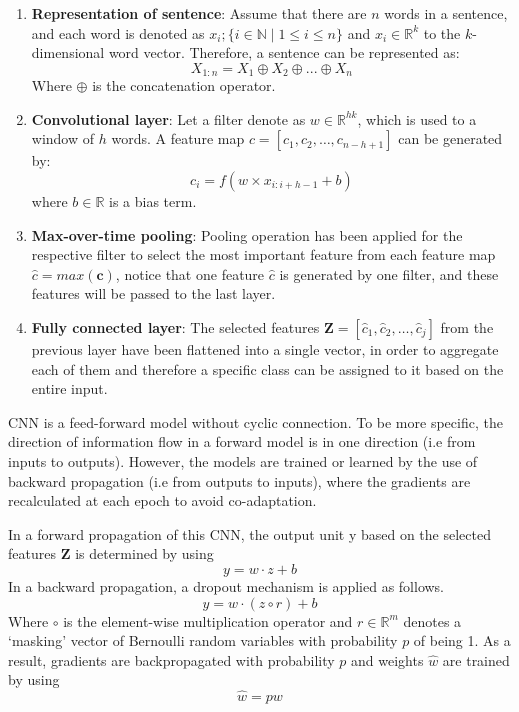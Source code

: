 \documentclass[]{krantz}
\begin{document}
\begin{enumerate}
\def\labelenumi{\arabic{enumi}.}
\item
  \textbf{Representation of sentence}: Assume that there are \(n\) words in a sentence, and each word is denoted as \(x_{i};\{i \in \mathbb{N} \mid 1 \leq i \leq n \}\) and \(x_{i} \in \mathbb{R}^{k}\) to the \(k\)-dimensional word vector. Therefore, a sentence can be represented as:
  \[ X_{1:n}=X_{1} \oplus X_{2} \oplus ... \oplus X_{n} \]
  Where \(\oplus\) is the concatenation operator.
\item
  \textbf{Convolutional layer}: Let a filter denote as \(w \in \mathbb{R}^{hk}\), which is used to a window of \(h\) words. A feature map \(c=[c_1,c_2,…,c_{n-h+1}]\) can be generated by:
  \[ c_i=f(w×x_{i:i+h-1}+b) \]
  where \(b \in \mathbb{R}\) is a bias term.
\item
  \textbf{Max-over-time pooling}: Pooling operation has been applied for the respective filter to select the most important feature from each feature map \(\hat{c} =max(\boldsymbol{c})\), notice that one feature \(\hat{c}\) is generated by one filter, and these features will be passed to the last layer.
\item
  \textbf{Fully connected layer}: The selected features \(\boldsymbol{Z}=[\hat{c}_1,\hat{c}_2,…,\hat{c}_j]\) from the previous layer have been flattened into a single vector, in order to aggregate each of them and therefore a specific class can be assigned to it based on the entire input.
\end{enumerate}

CNN is a feed-forward model without cyclic connection. To be more specific, the direction of information flow in a forward model is in one direction (i.e from inputs to outputs). However, the models are trained or learned by the use of backward propagation (i.e from outputs to inputs), where the gradients are recalculated at each epoch to avoid co-adaptation.

In a forward propagation of this CNN, the output unit y based on the selected features \(\boldsymbol{Z}\) is determined by using
\[y=w \cdot z+b\]
In a backward propagation, a dropout mechanism is applied as follows.
\[y=w \cdot (z \circ r)+b\]
Where \(\circ\) is the element-wise multiplication operator and \(r \in \mathbb{R}^{m}\) denotes a `masking' vector of Bernoulli random variables with probability \(p\) of being 1. As a result, gradients are backpropagated with probability \(p\) and weights \(\hat{w}\) are trained by using
\[\hat{w}=pw\]
\end{document}
